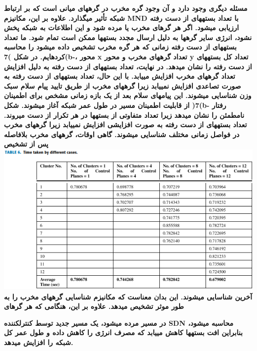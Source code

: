 \documentclass{article} %
\begin{document}
\noindent 
{\bf مسئله دیگری وجود دارد و آن وجود گره مخرب در گرههای میانی است که بر ارتباط شبکه تأثیر میگذارد. علاوه بر این، مکانیزم MND با تعداد بستههای از دست رفته ارزیابی میشود. اگر هر گرهای مخرب یا مرده شود و این اطلاعات به شبکه پخش نشود، انرژی سایر گرهها به دلیل ارسال مجدد بستهها ممکن است تمام شود. ما تعداد بستههای از دست رفته زمانی که هر گره مخرب تشخیص داده میشود را محاسبه کردهایم. در شکل )7(b-، محور x تعداد گرههای مخرب و محور y تعداد کل بستههای از دست رفته را نشان میدهد. در نهایت، تعداد بستههای از دست رفته به دلیل افزایش تعداد گرههای مخرب افزایش مییابد. با این حال، تعداد بستههای از دست رفته به صورت تصاعدی افزایش نمییابد زیرا گرههای مخرب از طریق تایید پیام سلام سبک وزن شناسایی میشوند. این پیامهای سلام بعد از یک بازه زمانی مشخص برای اطمینان از قابلیت اطمینان مسیر در طول عمر شبکه آغاز میشوند. شکل )7(b- رفتار نامطمئن را نشان میدهد زیرا تعداد متفاوتی از بستهها در هر تکرار از دست میروند. تعداد بستههای از دست رفته به صورت افزایشی افزایش نمییابد زیرا گرههای مخرب در فواصل زمانی مختلف شناسایی میشوند. گاهی اوقات، گرههای مخرب بلافاصله پس از تشخیص \includegraphics*[width=6.72in, height=2.96in]{image17}آخرین شناسایی میشوند. این بدان معناست که مکانیزم شناسایی گرههای مخرب را به طور موثر تشخیص میدهد. علاوه بر این، هنگامی که هر گرهای }

\noindent 
{\bf در مسیر مرده میشود، یک مسیر جدید توسط کنترلکننده SDN محاسبه میشود، بنابراین افت بستهها کاهش مییابد که مصرف انرژی را کاهش داده و طول عمر کل شبکه را افزایش میدهد.}
\end{document}
